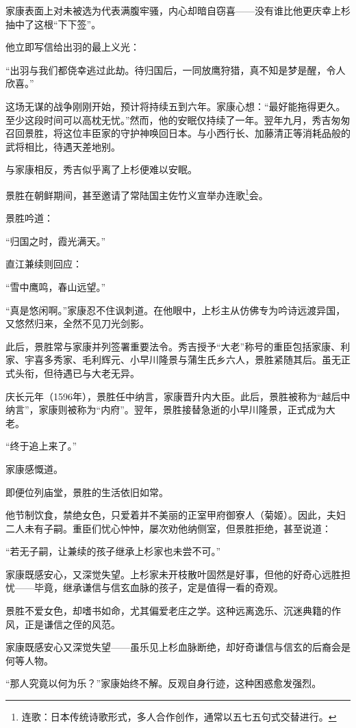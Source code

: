 \documentclass[
]{book}
\begin{document}
家康表面上对未被选为代表满腹牢骚，内心却暗自窃喜------没有谁比他更庆幸上杉抽中了这根``下下签''。

他立即写信给出羽的最上义光：

``出羽与我们都侥幸逃过此劫。待归国后，一同放鹰狩猎，真不知是梦是醒，令人欣喜。''

这场无谋的战争刚刚开始，预计将持续五到六年。家康心想：``最好能拖得更久。至少这段时间可以高枕无忧。''然而，他的安眠仅持续了一年。翌年九月，秀吉匆匆召回景胜，将这位丰臣家的守护神唤回日本。与小西行长、加藤清正等消耗品般的武将相比，待遇天差地别。

与家康相反，秀吉似乎离了上杉便难以安眠。

景胜在朝鲜期间，甚至邀请了常陆国主佐竹义宣举办连歌\footnote{连歌：日本传统诗歌形式，多人合作创作，通常以五七五句式交替进行。}会。

景胜吟道：

``归国之时，霞光满天。''

直江兼续则回应：

``雪中鹰鸣，春山远望。''

``真是悠闲啊。''家康忍不住讽刺道。在他眼中，上杉主从仿佛专为吟诗远渡异国，又悠然归来，全然不见刀光剑影。

此后，景胜常与家康并列签署重要法令。秀吉授予``大老''称号的重臣包括家康、利家、宇喜多秀家、毛利辉元、小早川隆景与蒲生氏乡六人，景胜紧随其后。虽无正式头衔，但待遇已与大老无异。

庆长元年（1596年），景胜任中纳言，家康晋升内大臣。此后，景胜被称为``越后中纳言''，家康则被称为``内府''。翌年，景胜接替急逝的小早川隆景，正式成为大老。

``终于追上来了。''

家康感慨道。

即便位列庙堂，景胜的生活依旧如常。

他节制饮食，禁绝女色，只爱着并不美丽的正室甲府御寮人（菊姬）。因此，夫妇二人未有子嗣。重臣们忧心忡忡，屡次劝他纳侧室，但景胜拒绝，甚至说道：

``若无子嗣，让兼续的孩子继承上杉家也未尝不可。''

家康既感安心，又深觉失望。上杉家未开枝散叶固然是好事，但他的好奇心远胜担忧------毕竟，继承谦信与信玄血脉的孩子，定是值得一看的奇观。

景胜不爱女色，却嗜书如命，尤其偏爱老庄之学。这种远离逸乐、沉迷典籍的作风，正是谦信之侄的风范。

家康既感安心又深觉失望------虽乐见上杉血脉断绝，却好奇谦信与信玄的后裔会是何等人物。

``那人究竟以何为乐？''家康始终不解。反观自身行迹，这种困惑愈发强烈。
\end{document}
